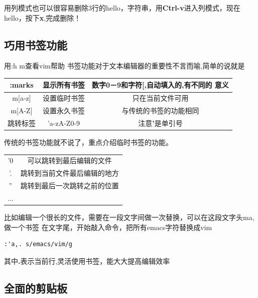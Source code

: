\documentclass[adobefonts]{ctexart}
\begin{document}
用列模式也可以很容易删除3行的hello，字符串，用\textbf{Ctrl-v}进入列模式，现在hello，按下\textbf{x},完成删除！



\subsection{巧用书签功能}
用:h m查看vim帮助
书签功能对于文本编辑器的重要性不言而喻,简单的说就是


\begin{tabular}{|c|c|c|}
\hline
:marks & 显示所有书签 & 数字0－9和字符[,自动填入的,有不同的 意义\\ \hline
m[a-z] & 设置临时书签 & 只在当前文件可用 \\ \hline
m[A-Z] & 设置永久书签 &  与传统的书签的功能相同\\ \hline
跳转标签 & '{a-zA-Z0-9}   &   注意\textbf{'}是单引号   \\ \hline
\end{tabular}


传统的书签功能就不说了，重点介绍临时书签的功能。

\begin{tabular}{c c}
'0  &  可以跳转到最后编辑的文件               \\
'.  &  跳转到当前文件最后编辑的地方           \\
''  &  跳转到最后一次跳转之前的位置           \\
...
\end{tabular}

比如编辑一个很长的文件，需要在一段文字间做一次替换，可以在这段文字头ma,做一个书签
在文字尾，开始敲入命令，把所有emacs字符替换成vim
\begin{verbatim}
:'a,. s/emacs/vim/g 
\end{verbatim}

其中\textbf{.}表示当前行,灵活使用书签，能大大提高编辑效率

\subsection{全面的剪贴板}


\end{document}
